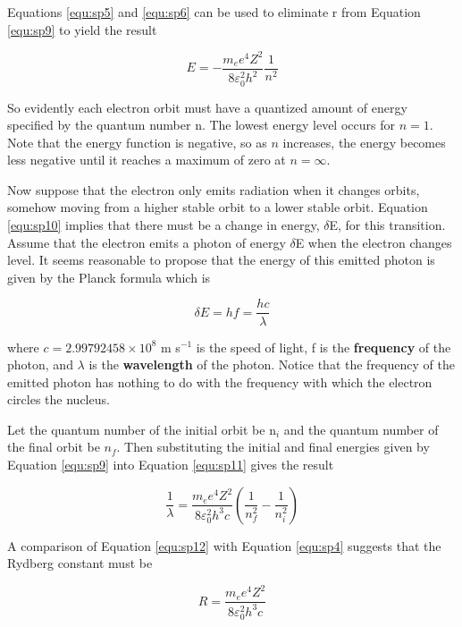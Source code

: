 Equations \ref{equ:sp5} and \ref{equ:sp6} can be used to eliminate r from Equation \ref{equ:sp9} to yield the result

\begin{equation}
E=-\dfrac{m_ee^4Z^2}{8\varepsilon_0^2h^2}\dfrac{1}{n^2}
\label{equ:sp10}
\end{equation}

So evidently each electron orbit must have a quantized amount of energy specified by the quantum number n. The lowest energy level occurs for $n=1$. Note that the energy function is negative, so as $n$ increases, the energy becomes less negative until it reaches a maximum of zero at $n=\infty$. 

Now suppose that the electron only emits radiation when it changes orbits, somehow moving from a higher stable orbit to a lower stable orbit. Equation \ref{equ:sp10} implies that there must be a change in energy, $\delta$E, for this transition. Assume that the electron emits a photon of energy $\delta$E when the electron changes level. It seems reasonable to propose that the energy of this emitted photon is given by the Planck formula which is

\begin{equation}
\delta E=hf=\dfrac{hc}{\lambda}
\label{equ:sp11}
\end{equation}

\noindent where $c = 2.99792458\times10^8$ m s$^{-1}$ is the speed of light, f is the {\bf frequency} of the photon, and $\lambda$ is the {\bf wavelength} of the photon. Notice that the frequency of the emitted photon has nothing to do with the frequency with which the electron circles the nucleus.

Let the quantum number of the initial orbit be n$_i$ and the quantum number of the final orbit be $n_f$. Then substituting the initial and final energies given by Equation \ref{equ:sp9} into Equation \ref{equ:sp11} gives the result

\begin{equation}
\dfrac{1}{\lambda}=\dfrac{m_ee^4Z^2}{8\varepsilon_0^2h^3c}\left(\dfrac{1}{n_f^2}-\dfrac{1}{n_i^2}\right)
\label{equ:sp12}
\end{equation}

\noindent A comparison of Equation \ref{equ:sp12} with Equation \ref{equ:sp4} suggests that the Rydberg constant must be

\begin{equation}
R=\dfrac{m_ee^4Z^2}{8\varepsilon_0^2h^3c}
\label{equ:sp13}
\end{equation}


